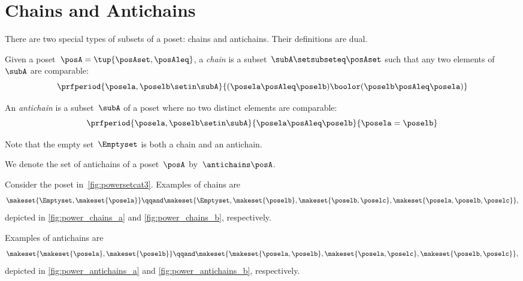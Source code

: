 
\section{Chains and Antichains}
\label{sec:chains-antichains}

There are two special types of subsets of a poset: chains and antichains.
Their definitions are dual.

\begin{definition}
    \label{def:chain}
    Given a poset~$\posA = \tup{\posAset, \posAleq}$, a \emph{chain} is a subset~$\subA \setsubseteq \posAset$ such that any two elements of~$\subA$ are comparable:
    \begin{equation}
        \prfperiod{
            \posela,\poselb \setin \subA
        }{
            (\posela \posAleq  \poselb) \boolor (\poselb \posAleq  \posela)
        }
    \end{equation}
\end{definition}

\begin{definition}
    \label{def:antichain}
    An \emph{antichain} is a subset~$\subA$ of a poset where no two distinct elements are comparable:
    \begin{equation}
        \prfperiod{
            \posela, \poselb \setin \subA
        }{
            \posela \posAleq \poselb
        }{
            \posela = \poselb
        }
    \end{equation}
\end{definition}
\begin{remark}
    Note that the empty set~$\Emptyset$ is both a chain and an antichain.
\end{remark}

We denote the set of antichains of a poset~$\posA$ by~$\antichains\posA$.

\begin{example}
    Consider the poset in~\cref{fig:powersetcat3}.
    Examples of chains are
    \begin{equation}
        \makeset{\Emptyset,\makeset{\posela}}
        \qqand
        \makeset{\Emptyset,\makeset{\poselb},\makeset{\poselb,\poselc},\makeset{\posela,\poselb,\poselc}},
    \end{equation}
    depicted in \cref{fig:power_chains_a} and \cref{fig:power_chains_b}, respectively.

    Examples of antichains are
    \begin{equation}
        \makeset{\makeset{\posela},\makeset{\poselb}}
        \qqand
        \makeset{\makeset{\posela,\poselb}, \makeset{\posela,\poselc}, \makeset{\poselb,\poselc}},
    \end{equation}
    depicted in \cref{fig:power_antichains_a} and \cref{fig:power_antichains_b}, respectively.
\end{example}


